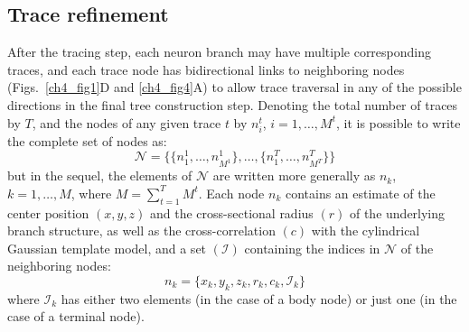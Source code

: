 \subsection{Trace refinement}
\label{subsec:trace-refinement}
After the tracing step, each neuron branch may have multiple corresponding traces, and each trace node has bidirectional links to neighboring nodes (Figs.~\ref{ch4_fig1}D and \ref{ch4_fig4}A) to allow trace traversal in any of the possible directions in the final tree construction step. Denoting the total number of traces by $T$, and the nodes of any given trace $t$ by $n_i^t$, $i=1,\dots,M^t$, it is possible to write the complete set of nodes as:
\begin{equation}
\label{eq:N}
\mathcal{N} = \bigg\{
\Big\{ n_1^1,\dots,n_{M^1}^1\Big\},
\dots,
\Big\{ n_1^T,\dots,n_{M^T}^T\Big\}
\bigg\}
\end{equation}
but in the sequel, the elements of $\mathcal{N}$ are written more generally as $n_k$, $k=1,\dots,M$, where $M=\sum_{t=1}^{T}M^t$. Each node $n_k$ contains an estimate of the center position $\left(x,y,z\right)$ and the cross-sectional radius $\left(r\right)$ of the underlying branch structure, as well as the cross-correlation $\left(c\right)$ with the cylindrical Gaussian template model, and a set $\left( \mathcal{I} \right)$ containing the indices in $\mathcal{N}$ of the neighboring nodes:
\begin{equation}
\label{eq:n_k}
n_k = \lbrace x_k, y_k, z_k, r_k, c_k, \mathcal{I}_k \rbrace
\end{equation}
where $\mathcal{I}_k$ has either two elements (in the case of a body node) or just one (in the case of a terminal node).

